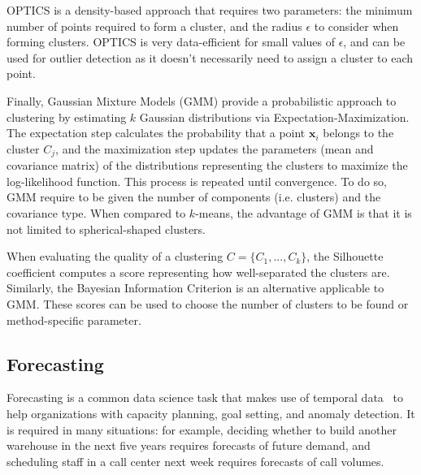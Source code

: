 \documentclass[a4paper, 12pt]{article} %
\begin{document}
	OPTICS \cite{OPTICS} is a density-based approach that requires two parameters: the minimum number of points required to form a cluster, and the radius $\epsilon$ to consider when forming clusters. OPTICS is very data-efficient for small values of $\epsilon$, and can be used for outlier detection as it doesn't necessarily need to assign a cluster to each point.
	
	Finally, Gaussian Mixture Models (GMM) \cite{MixtureModels} provide a probabilistic approach to clustering by estimating $k$ Gaussian distributions via Expectation-Maximization. The expectation step calculates the probability that a point $\pmb{x}_i$ belongs to the cluster $C_j$, and the maximization step updates the parameters (mean and covariance matrix) of the distributions representing the clusters to maximize the log-likelihood function. This process is repeated until convergence. To do so, GMM require to be given the number of components (i.e. clusters) and the covariance type. When compared to $k$-means, the advantage of GMM is that it is not limited to spherical-shaped clusters.
	
	When evaluating the quality of a clustering $C=\{C_1, ..., C_k\}$, the Silhouette coefficient \cite{SilhouetteCoefficient} computes a score representing how well-separated the clusters are. Similarly, the Bayesian Information Criterion \cite{BayesianInformationCriterion} is an alternative applicable to GMM. These scores can be used to choose the number of clusters to be found or method-specific parameter.
	
	\subsection{Forecasting } \label{sec:forecasting}
	Forecasting is a common data science task that makes use of temporal data~\cite{ForecastingSurvey} to help organizations with capacity planning, goal setting, and anomaly detection. It is required in many situations: for example, deciding whether to build another warehouse in the next five years requires forecasts of future demand, and scheduling staff in a call center next week requires forecasts of call volumes.
	
\end{document}

